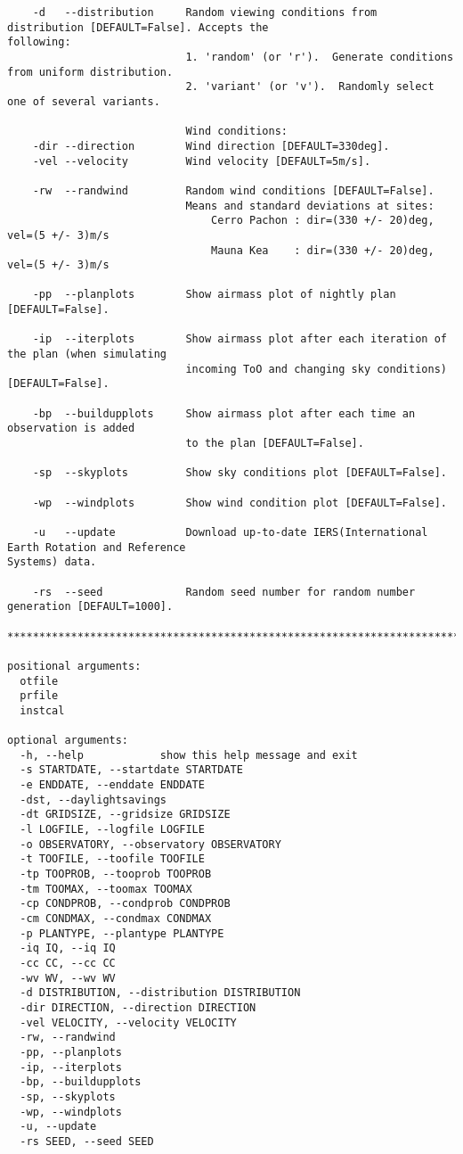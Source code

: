 \documentclass{article}
\begin{document}
\begin{lstlisting}
    -d   --distribution     Random viewing conditions from distribution [DEFAULT=False]. Accepts the 										 following:
                            1. 'random' (or 'r').  Generate conditions from uniform distribution.
                            2. 'variant' (or 'v').  Randomly select one of several variants.

                            Wind conditions:
    -dir --direction        Wind direction [DEFAULT=330deg].
    -vel --velocity         Wind velocity [DEFAULT=5m/s].

    -rw  --randwind         Random wind conditions [DEFAULT=False]. 
                            Means and standard deviations at sites:
                                Cerro Pachon : dir=(330 +/- 20)deg, vel=(5 +/- 3)m/s
                                Mauna Kea    : dir=(330 +/- 20)deg, vel=(5 +/- 3)m/s                            

    -pp  --planplots        Show airmass plot of nightly plan [DEFAULT=False].

    -ip  --iterplots        Show airmass plot after each iteration of the plan (when simulating 
                            incoming ToO and changing sky conditions) [DEFAULT=False].

    -bp  --buildupplots     Show airmass plot after each time an observation is added 
                            to the plan [DEFAULT=False].

    -sp  --skyplots         Show sky conditions plot [DEFAULT=False]. 

    -wp  --windplots        Show wind condition plot [DEFAULT=False]. 

    -u   --update           Download up-to-date IERS(International Earth Rotation and Reference 										  Systems) data.

    -rs  --seed             Random seed number for random number generation [DEFAULT=1000].

*****************************************************************************************************                        

positional arguments:
  otfile
  prfile
  instcal

optional arguments:
  -h, --help            show this help message and exit
  -s STARTDATE, --startdate STARTDATE
  -e ENDDATE, --enddate ENDDATE
  -dst, --daylightsavings
  -dt GRIDSIZE, --gridsize GRIDSIZE
  -l LOGFILE, --logfile LOGFILE
  -o OBSERVATORY, --observatory OBSERVATORY
  -t TOOFILE, --toofile TOOFILE
  -tp TOOPROB, --tooprob TOOPROB
  -tm TOOMAX, --toomax TOOMAX
  -cp CONDPROB, --condprob CONDPROB
  -cm CONDMAX, --condmax CONDMAX
  -p PLANTYPE, --plantype PLANTYPE
  -iq IQ, --iq IQ
  -cc CC, --cc CC
  -wv WV, --wv WV
  -d DISTRIBUTION, --distribution DISTRIBUTION
  -dir DIRECTION, --direction DIRECTION
  -vel VELOCITY, --velocity VELOCITY
  -rw, --randwind
  -pp, --planplots
  -ip, --iterplots
  -bp, --buildupplots
  -sp, --skyplots
  -wp, --windplots
  -u, --update
  -rs SEED, --seed SEED

\end{lstlisting}
\end{document}
